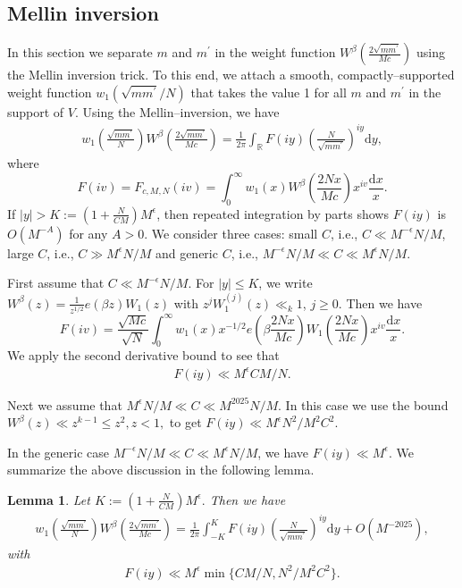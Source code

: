 \documentclass[12pt,a4paper,twoside, reqno]{amsart}
\newtheorem{lemma}{Lemma}
\begin{document}
\subsection{Mellin inversion}
In this section we separate $m$ and $m^\prime$ in the weight function $W^{\beta}\left(\frac{2 \sqrt{mm^\prime}}{Mc}\right)$ using the Mellin inversion trick. To this end,  we attach a smooth, compactly--supported weight function $w_1(\sqrt{mm^\prime}/N)$ that 
takes the value  1 for all $m$ and $m^\prime$ in the support of $V$. Using the Mellin--inversion, we have
\begin{align}\label{mellin 2}
     w_1 \left(\frac{\sqrt{mm^\prime}}{N}\right) W^{\beta}\left(\frac{2 \sqrt{mm^\prime}}{Mc}\right)=\frac{1}{2\pi}\int_{\mathbb{R}} F(iy) \left(\frac{N}{\sqrt{mm^\prime}} \right)^{iy} \mathrm{d}y,
\end{align}
where 
\[F(iv)=F_{c,M,N}(iv)=\int_0^{\infty} w_1(x) W^{\beta}\left( \frac{2 Nx}{Mc}\right) x^{iv} \frac{\mathrm{d}x}{x}.\]
If $|y| > K:=(1+ \frac{N}{CM})M^{\epsilon}$, then repeated integration by parts shows $F (iy)$  is $O(M^{-A})$ for any $A>0$.  We consider three cases: small $C$, i.e., $ C \ll M^{-\epsilon}N/M$,  large $C$, i.e., $ C \gg M^{\epsilon}N/M$ and  generic $C$, i.e., $  M^{-\epsilon}N/M \ll C \ll M^{\epsilon}N/M$. 

First assume that $C \ll M^{-\epsilon}N/M$. For $|y| \leq K$, we write $W^\beta(z)=\frac{1}{{z^{1/2}}} e(\beta z) W_1(z) $ with $z^jW_1^{(j)}(z) \ll_k 1 $, $j \geq  0$.  
Then  we have 
\[F(iv)= \frac{\sqrt{Mc}}{\sqrt{N}}\int_0^{\infty} w_1(x) x^{-1/2}e\left( \beta \frac{2 Nx}{Mc}\right) W_1\left(  \frac{2 Nx}{Mc}\right) x^{iv} \frac{\mathrm{d}x}{x}.\]
We apply the second derivative bound  to see that 
\begin{align}
    F(iy) \ll M^\epsilon {CM/N}.
\end{align}


Next we assume that  $ M^{\epsilon}N/M \ll C \ll M^{2025}N/M $. In this case we use the bound $W^{\beta}(z) \ll z^{k-1} \leq z^2, z<1, $  to get $ F(iy) \ll M^\epsilon {N^2}/M^2C^2. $

In the generic case $  M^{-\epsilon}N/M \ll C \ll M^{\epsilon}N/M$, we have $F(iy) \ll M^{\epsilon}. $
We summarize the above discussion in the following lemma. 
\begin{lemma}\label{separ}
   Let $K:=(1+ \frac{N}{CM})M^{\epsilon}.$ Then  we have 
    \begin{align}\label{mellin}
     w_1 \left(\frac{\sqrt{mm^\prime}}{N}\right) W^{\beta}\left(\frac{2 \sqrt{mm^\prime}}{Mc}\right)=\frac{1}{2\pi}\int_{-K}^{K} F(iy) \left(\frac{N}{\sqrt{mm^\prime}} \right)^{iy} \mathrm{d}y +O(M^{-2025}),
\end{align}
    with 
    \begin{align}\label{second derivative}
    F(iy) \ll M^\epsilon \min \{ {CM/N}, N^2/M^2C^2\}.
\end{align}
\end{lemma}
\end{document}
